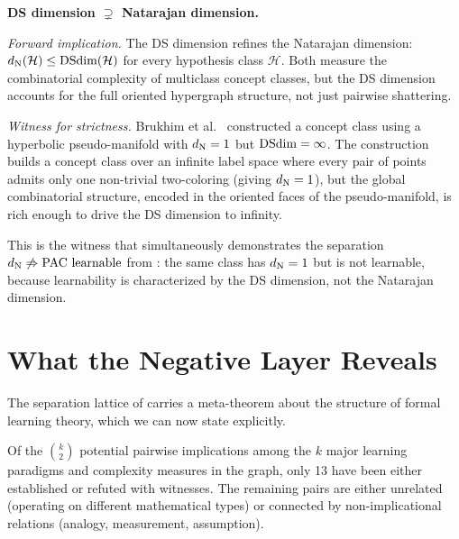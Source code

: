 
\begin{separation}
\textbf{DS dimension $\supsetneq$ Natarajan dimension.}

\medskip\noindent
\emph{Forward implication.}
The DS dimension refines the Natarajan dimension: $d_{\mathrm{N}}(\mathcal{H})
\leq \mathrm{DSdim}(\mathcal{H})$ for every hypothesis class $\mathcal{H}$.
Both measure the combinatorial complexity of multiclass concept classes,
but the DS dimension accounts for the full oriented hypergraph structure,
not just pairwise shattering.

\medskip\noindent
\emph{Witness for strictness.}
Brukhim et al.~\cite{BrukhimCarmonDinurMoranYehudayoff2022} constructed
a concept class using a hyperbolic pseudo-manifold with $d_{\mathrm{N}} = 1$
but $\mathrm{DSdim} = \infty$. The construction builds a concept class over an
infinite label space where every pair of points admits only one
non-trivial two-coloring (giving $d_{\mathrm{N}} = 1$), but the global
combinatorial structure, encoded in the oriented faces of the
pseudo-manifold, is rich enough to drive the DS dimension to infinity.

This is the witness that simultaneously demonstrates the separation
$d_{\mathrm{N}} \not\Rightarrow \text{PAC learnable}$ from :
the same class has $d_{\mathrm{N}} = 1$ but is not learnable, because learnability
is characterized by the DS dimension, not the Natarajan dimension.

\hfill\cite{BrukhimCarmonDinurMoranYehudayoff2022}
\end{separation}



\section{What the Negative Layer Reveals}
\label{sec:neg-layer-summary}

The separation lattice of  carries a
meta-theorem about the structure of formal learning theory, which we
can now state explicitly.

\begin{thm}
\label{thm:sparsity}
Of the $\binom{k}{2}$ potential pairwise implications among the $k$
major learning paradigms and complexity measures in the graph, only
13 have been either established or refuted with witnesses. The
remaining pairs are either unrelated (operating on different
mathematical types) or connected by non-implicational relations
(analogy, measurement, assumption).
\end{thm}

